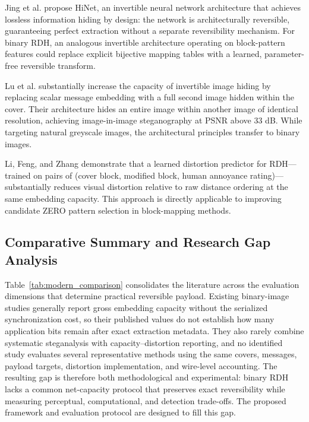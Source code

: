 \documentclass[a4paper,fleqn]{cas-dc}
\begin{document}
Jing et al. \cite{Jing2021HiNet} propose HiNet, an invertible neural network architecture that achieves lossless information hiding by design: the network is architecturally reversible, guaranteeing perfect extraction without a separate reversibility mechanism. For binary RDH, an analogous invertible architecture operating on block-pattern features could replace explicit bijective mapping tables with a learned, parameter-free reversible transform.

Lu et al. \cite{Lu2021LargeCapacity} substantially increase the capacity of invertible image hiding by replacing scalar message embedding with a full second image hidden within the cover. Their architecture hides an entire image within another image of identical resolution, achieving image-in-image steganography at PSNR above 33 dB. While targeting natural greyscale images, the architectural principles transfer to binary images.

Li, Feng, and Zhang \cite{Li2021LearnedRDH} demonstrate that a learned distortion predictor for RDH---trained on pairs of (cover block, modified block, human annoyance rating)---substantially reduces visual distortion relative to raw distance ordering at the same embedding capacity. This approach is directly applicable to improving candidate ZERO pattern selection in block-mapping methods.

\subsection{Comparative Summary and Research Gap Analysis}

Table~\ref{tab:modern_comparison} consolidates the literature across the
evaluation dimensions that determine practical reversible payload. Existing
binary-image studies generally report gross embedding capacity without the
serialized synchronization cost, so their published values do not establish
how many application bits remain after exact extraction metadata. They also
rarely combine systematic steganalysis with capacity--distortion reporting,
and no identified study evaluates several representative methods using the
same covers, messages, payload targets, distortion implementation, and
wire-level accounting. The resulting gap is therefore both methodological and
experimental: binary RDH lacks a common net-capacity protocol that preserves
exact reversibility while measuring perceptual, computational, and detection
trade-offs. The proposed framework and evaluation protocol are designed to
fill this gap.
\end{document}

